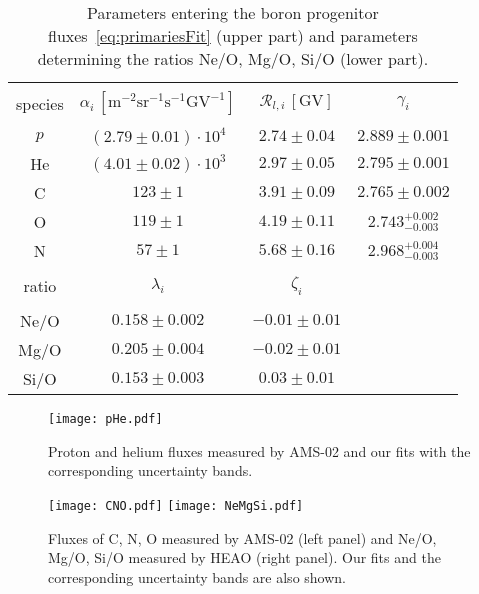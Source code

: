 \documentclass[a4paper,11pt]{article}
\newcommand{\R}{\mathcal{R}}
\begin{document}
\begin{table}[htp]
\begin{center}
\begin{tabular}{|cccc|}
\hline
\rowcolor{light-gray}&&&\\[-3mm]
\rowcolor{light-gray} species&\(\alpha_i\, [\text{m}^{-2}\text{sr}^{-1}\text{s}^{-1}\text{GV}^{-1}]\)&\(\R_{l,i}\,[\text{GV}]\)&\(\gamma_i\)\\[1mm]
\hline 
&&&\\[-3mm]
$p$ & $(2.79\pm 0.01)\cdot 10^4$  & $2.74\pm 0.04$ & $2.889\pm 0.001$\\[2mm]
He & $(4.01\pm 0.02)\cdot 10^3$ & $2.97\pm 0.05$ & $2.795\pm 0.001$ \\[2mm]
C & $123\pm 1$ & $3.91\pm 0.09$ & $2.765\pm 0.002$\\[2mm]
O & $119\pm 1$ & $4.19\pm 0.11$ & $2.743^{+0.002}_{-0.003}$ \\[2mm]
N & $57\pm 1$ & $5.68\pm 0.16$ & $2.968^{+0.004}_{-0.003}$\\[2mm]
\hline
\rowcolor{light-gray}&&&\\[-3mm]
\rowcolor{light-gray} ratio& $\lambda_i$ & $\zeta_i$ &\\[1mm]
\hline 
&&&\\[-3mm]
Ne/O & $0.158 \pm 0.002 $  & $-0.01\pm 0.01$ & \\[2mm]
Mg/O & $0.205 \pm 0.004 $  & $-0.02\pm 0.01$ & \\[2mm]
Si/O & $0.153 \pm 0.003 $  & $0.03 \pm 0.01$ & \\[2mm]
\hline
\end{tabular}
\caption{Parameters entering the boron progenitor fluxes~\eqref{eq:primariesFit} (upper part) and parameters determining the ratios Ne/O, Mg/O, Si/O (lower part).}
\label{tab:primariesFit}
\end{center}
\end{table}

\begin{figure}
	\centering
	\texttt{[image: pHe.pdf]}
	\caption{Proton and helium fluxes measured by AMS-02 and our fits with the corresponding uncertainty bands.}
	\label{fig:primaries}
\end{figure}

\begin{figure}
	\centering
  \texttt{[image: CNO.pdf]}
  \hspace{4mm}
	\texttt{[image: NeMgSi.pdf]}
	\caption{Fluxes of C, N, O measured by AMS-02 (left panel) and Ne/O, Mg/O, Si/O measured by HEAO (right panel). Our fits and the corresponding uncertainty bands are also shown.}
	\label{fig:nemgsi}
\end{figure}
\end{document}
